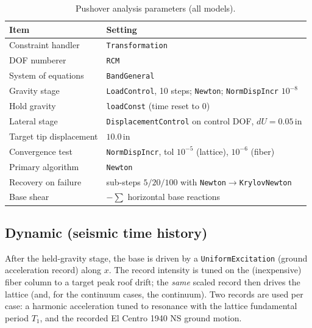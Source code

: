 \documentclass[11pt]{article}
\newcommand{\unit}[1]{\,\mathrm{#1}}
\newcommand{\code}[1]{\texttt{#1}}
\begin{document}
\begin{table}[H]
\centering
\caption{Pushover analysis parameters (all models).}
\begin{tabular}{>{\raggedright\arraybackslash}p{4.4cm} >{\raggedright\arraybackslash}p{10.8cm}}
\toprule
Item & Setting \\
\midrule
Constraint handler   & \code{Transformation} \\
DOF numberer         & \code{RCM} \\
System of equations  & \code{BandGeneral} \\
Gravity stage        & \code{LoadControl}, 10 steps; \code{Newton}; \code{NormDispIncr} $10^{-8}$ \\
Hold gravity         & \code{loadConst} (time reset to 0) \\
Lateral stage        & \code{DisplacementControl} on control DOF, $dU=0.05\unit{in}$ \\
Target tip displacement & $10.0\unit{in}$ \\
Convergence test     & \code{NormDispIncr}, tol $10^{-5}$ (lattice), $10^{-6}$ (fiber) \\
Primary algorithm    & \code{Newton} \\
Recovery on failure  & sub-steps $5/20/100$ with
                       \code{Newton}$\to$\code{KrylovNewton} \\
Base shear           & $-\sum$ horizontal base reactions \\
\bottomrule
\end{tabular}
\end{table}

\subsection{Dynamic (seismic time history)}
\label{sec:proc-dynamic}

After the held-gravity stage, the base is driven by a \code{UniformExcitation} (ground
acceleration record) along $x$. The record intensity is tuned on the (inexpensive) fiber column to
a target peak roof drift; the \emph{same} scaled record then drives the lattice (and, for the
continuum cases, the continuum). Two records are used per case: a harmonic acceleration tuned to
resonance with the lattice fundamental period $T_1$, and the recorded El Centro 1940 NS ground
motion.
\end{document}
